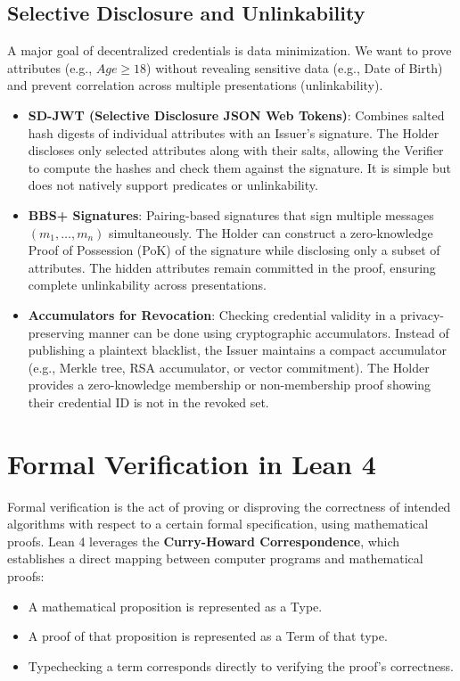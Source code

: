 \documentclass{article}
\begin{document}
\subsection{Selective Disclosure and Unlinkability}
A major goal of decentralized credentials is data minimization. We want to prove attributes (e.g., $Age \ge 18$) without revealing sensitive data (e.g., Date of Birth) and prevent correlation across multiple presentations (unlinkability).
\begin{itemize}
    \item \textbf{SD-JWT (Selective Disclosure JSON Web Tokens)}: Combines salted hash digests of individual attributes with an Issuer's signature. The Holder discloses only selected attributes along with their salts, allowing the Verifier to compute the hashes and check them against the signature. It is simple but does not natively support predicates or unlinkability.
    \item \textbf{BBS+ Signatures}: Pairing-based signatures that sign multiple messages $(m_1, \dots, m_n)$ simultaneously. The Holder can construct a zero-knowledge Proof of Possession (PoK) of the signature while disclosing only a subset of attributes. The hidden attributes remain committed in the proof, ensuring complete unlinkability across presentations.
    \item \textbf{Accumulators for Revocation}: Checking credential validity in a privacy-preserving manner can be done using cryptographic accumulators. Instead of publishing a plaintext blacklist, the Issuer maintains a compact accumulator (e.g., Merkle tree, RSA accumulator, or vector commitment). The Holder provides a zero-knowledge membership or non-membership proof showing their credential ID is not in the revoked set.
\end{itemize}

\section{Formal Verification in Lean 4}
Formal verification is the act of proving or disproving the correctness of intended algorithms with respect to a certain formal specification, using mathematical proofs. Lean 4 leverages the \textbf{Curry-Howard Correspondence}, which establishes a direct mapping between computer programs and mathematical proofs:
\begin{itemize}
    \item A mathematical proposition is represented as a Type.
    \item A proof of that proposition is represented as a Term of that type.
    \item Typechecking a term corresponds directly to verifying the proof's correctness.
\end{itemize}
\end{document}
